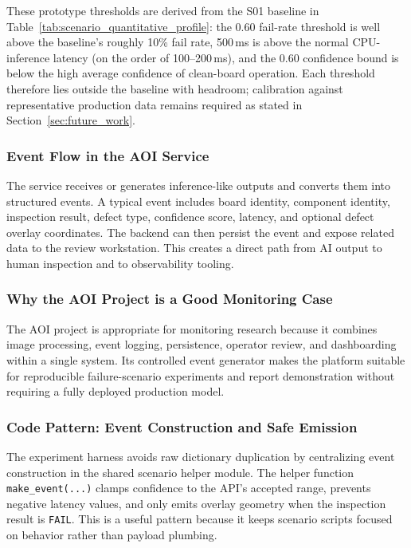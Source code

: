 \documentclass[12pt,a4paper]{article}
\begin{document}
These prototype thresholds are derived from the S01 baseline in
Table~\ref{tab:scenario_quantitative_profile}: the 0.60 fail-rate threshold is
well above the baseline's roughly 10\% fail rate, 500\,ms is above the normal
CPU-inference latency (on the order of 100--200\,ms), and the 0.60 confidence
bound is below the high average confidence of clean-board operation. Each
threshold therefore lies outside the baseline with headroom; calibration against
representative production data remains required as stated in
Section~\ref{sec:future_work}.

\subsubsection{Event Flow in the AOI Service}
The service receives or generates inference-like outputs and converts them into
structured events. A typical event includes board identity, component identity,
inspection result, defect type, confidence score, latency, and optional defect
overlay coordinates. The backend can then persist the event and expose related
data to the review workstation. This creates a direct path from AI output to
human inspection and to observability tooling.

\subsubsection{Why the AOI Project is a Good Monitoring Case}
The AOI project is appropriate for monitoring research because it combines
image processing, event logging, persistence, operator review, and dashboarding
within a single system. Its controlled event generator makes the platform
suitable for reproducible failure-scenario experiments and report
demonstration without requiring a fully deployed production model.

\subsubsection{Code Pattern: Event Construction and Safe Emission}
The experiment harness avoids raw dictionary duplication by centralizing event
construction in the shared scenario helper module. The helper function
\texttt{make\_event(...)} clamps confidence to the API's accepted range,
prevents negative latency values, and only emits overlay geometry when the
inspection result is \texttt{FAIL}. This is a useful pattern because it keeps
scenario scripts focused on behavior rather than payload plumbing.
\end{document}
